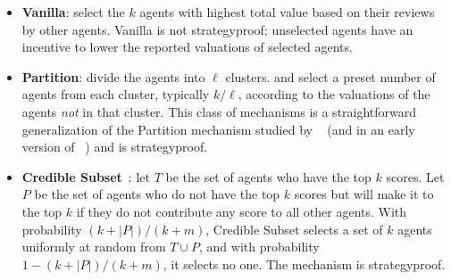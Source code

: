 \documentclass[letterpaper]{article}
\newcommand{\citet}[1]{\citeauthor{#1}~\shortcite{#1}}
\newcommand{\citep}{\cite}
\begin{document}
\begin{itemize}[leftmargin=*]
\item \textbf{Vanilla}: %
select the $k$ agents with highest total value based on their reviews by other agents.
Vanilla is not strategyproof; unselected agents have an incentive to lower the reported valuations of selected agents. 
\item \textbf{Partition}: divide the agents into ${\ell}$ clusters. and select a preset number of agents from each cluster, typically $k/\ell$, according to the valuations of the agents \emph{not} in that cluster. This class of mechanisms is a straightforward generalization of the Partition mechanism studied by \citet{AFPT11a} (and in an early version of \citet{KLMP15b}) and is strategyproof. 
\item \textbf{Credible Subset}~\citep{KLMP15b}: 
let $T$ be the set of agents who have the top $k$ scores. 
Let $P$ be the set of agents who do not have the top $k$ scores but will make it to the top $k$ if they do not contribute any score to all other agents. 
With probability $(k+|P|)/(k+m)$, Credible Subset selects a set of $k$ agents uniformly at random from $T\cup P$, and with probability $1-(k+|P|)/(k+m)$, it selects no one. The mechanism is strategyproof. %



\end{itemize}
\end{document}
